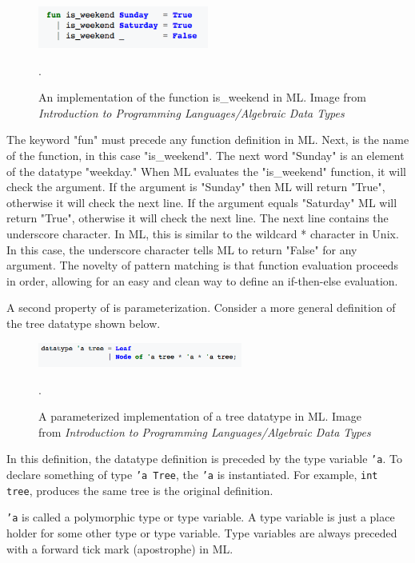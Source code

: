 \documentclass[../../main/main.tex]{subfiles}
\begin{document}
\begin{figure}[h]
\centering
\includegraphics[width=0.5\textwidth]{../figures/isweekend}
\caption{\label{isweekend} An implementation of the function is_weekend in ML.  Image from \textit{Introduction to Programming Languages/Algebraic Data Types} \cite{types} }.  
\end{figure}


The keyword "fun" must precede any function definition in ML. Next, is the name of the function, in this case "is_weekend".  The next word "Sunday" is an element of the datatype "weekday."  When ML evaluates the "is_weekend" function, it will check the argument.  If the argument is "Sunday" then ML will return "True", otherwise it will check the next line.  If the argument equals "Saturday" ML will return "True", otherwise it will check the next line.  The next line contains the underscore character.  In ML, this is similar to the wildcard * character in Unix.  In this case, the underscore character tells ML to return "False" for any argument.  The novelty of pattern matching is that function evaluation proceeds in order, allowing for an easy and clean way to define an if-then-else evaluation.

A second property of  is parameterization.  Consider a more general definition of the tree datatype shown below.

\begin{figure}[h]
\centering
\includegraphics[width=0.6\textwidth]{../figures/treeparam}
\caption{\label{treeparam} A parameterized implementation of a tree datatype in ML.  Image from \textit{Introduction to Programming Languages/Algebraic Data Types} \cite{types} }.  
\end{figure}

In this definition, the datatype definition is preceded by the type variable \texttt{'a}.  To declare something of type \texttt{'a Tree}, the \texttt{'a} is instantiated.  For example, \texttt{int tree}, produces the same tree is the original definition.  

\texttt{'a} is called a polymorphic type or type variable.  A type variable is just a place holder for some other type or type variable.  Type variables are always preceded with a forward tick mark (apostrophe) in ML.
\end{document}
